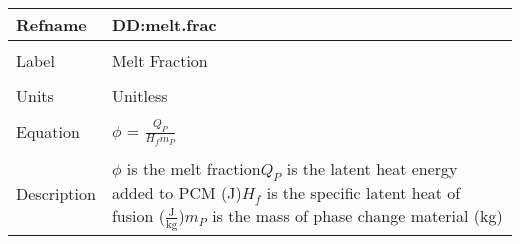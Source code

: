 \documentclass[12pt]{article}
\begin{document}
~\newline
\noindent \begin{minipage}{\textwidth}
\begin{tabular}{p{} p{}}
\toprule \textbf{Refname} & \textbf{DD:melt.frac}
\label{DD:melt.frac}
\\ \midrule \\
Label & Melt Fraction
\\ \midrule \\
Units & Unitless
\\ \midrule \\
Equation & $\phi{}$ = $\frac{{Q_{P}}}{{H_{f}} {m_{P}}}$
\\ \midrule \\
Description & $\phi{}$ is the melt fraction\newline${Q_{P}}$ is the latent heat energy added to PCM (J)\newline${H_{f}}$ is the specific latent heat of fusion ($\frac{\text{J}}{\text{kg}}$)\newline${m_{P}}$ is the mass of phase change material (kg)
\\ \bottomrule \end{tabular}
\end{minipage}\\
\end{document}
